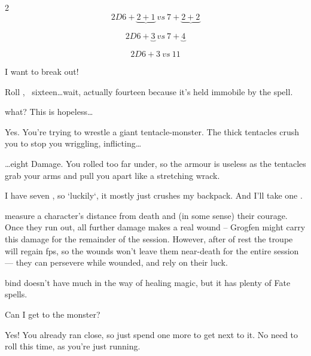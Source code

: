 \begin{multicols}{2}
$$2D6 + \underbrace{2 + 1} ~vs~ 7 + \underbrace{2 + 2}$$

$$2D6 + \underbrace{3} ~vs~ 7 + \underbrace{4}$$

$$2D6+3 ~vs~ 11$$


\bigLine \vspace{\baselineskip}

\begin{description}\sffamily
  \item[Player 2:] I want to break out!
  \item[\Gls{gm}:] Roll , ~sixteen\ldots wait, actually fourteen because it's held immobile by the \gls{spell}.
  \item[Player 2:]   what?  This is hopeless\ldots

  \item[\Gls{gm}:] Yes.
  You're trying to wrestle a giant tentacle-\gls{monster}.
  The thick tentacles crush you to stop you wriggling, inflicting\ldots

  \ldots eight Damage.
  You rolled too far under, so the armour is useless as the tentacles grab your
  arms and pull you apart like a stretching wrack.

  \item[Player 2:] I have seven , so `luckily`, it mostly just
  crushes my backpack.  And I'll take one .

\end{description}

\bigLine \vspace{\baselineskip}

 measure a character's distance from death and (in some
sense) their courage.  Once they run out, all further damage makes a real wound
-- Grogfen might carry this damage for the remainder of the session.
However, after  of rest the troupe will regain \glspl{fp}, so the
wounds won't leave them near-death for the entire session --- they can persevere
while wounded, and rely on their luck.

\Gls{bind} doesn't have much in the way of healing magic, but it has plenty of
Fate spells.

\bigLine \vspace{\baselineskip}

\begin{description}\sffamily
  \item[Player 3:] Can I get to the \gls{monster}?
  \item[\Gls{gm}:] Yes!
  You already ran close, so just spend one more  to get next to it.
  No need to roll this time, as you're just running.


\end{description}
\end{multicols}
